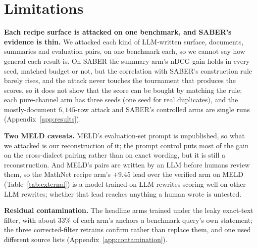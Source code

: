 \section{Limitations}
\label{sec:limitations}

\textbf{Each recipe surface is attacked on one benchmark, and SABER's evidence is thin.} We attacked each kind of LLM-written surface, documents, summaries and evaluation pairs, on one benchmark each, so we cannot say how general each result is. On SABER the summary arm's nDCG gain holds in every seed, matched budget or not, but the correlation with SABER's construction rule barely rises, and the attack never touches the tournament that produces the scores, so it does not show that the score can be bought by matching the rule; each pure-channel arm has three seeds (one seed for real duplicates), and the mostly-document $6{,}145$-row attack and SABER's controlled arms are single runs (Appendix~\ref{app:results}).

\textbf{Two MELD caveats.} MELD's evaluation-set prompt is unpublished, so what we attacked is our reconstruction of it; the prompt control puts most of the gain on the cross-dialect pairing rather than on exact wording, but it is still a reconstruction. And MELD's pairs are written by an LLM before humans review them, so the MathNet recipe arm's $+9.45$ lead over the verified arm on MELD (Table~\ref{tab:external}) is a model trained on LLM rewrites scoring well on other LLM rewrites; whether that lead reaches anything a human wrote is untested.

\textbf{Residual contamination.} The headline arms trained under the leaky exact-text filter, with about $33\%$ of each arm's anchors a benchmark query's own statement; the three corrected-filter retrains confirm rather than replace them, and one used different source lists (Appendix~\ref{app:contamination}).

